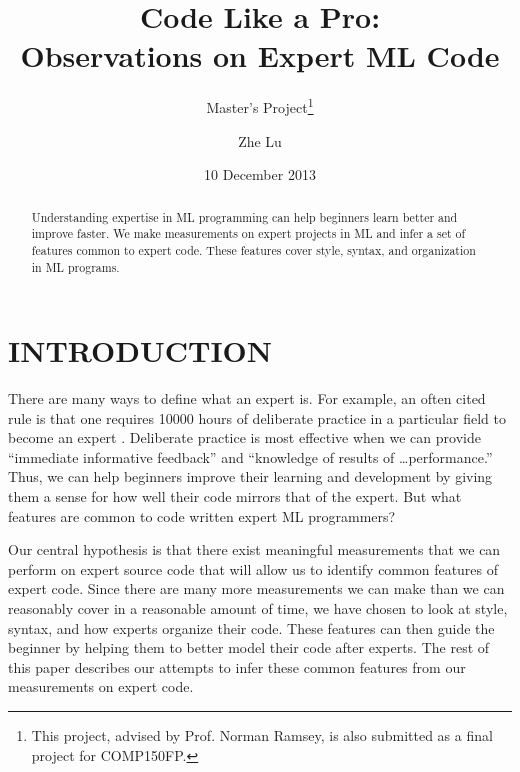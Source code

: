 \documentclass[12pt,abstracton]{scrartcl}
\title{Code Like a Pro:\\Observations on Expert ML Code}
\subtitle{Master's Project\footnote{This project, advised by Prof. Norman Ramsey, is also submitted as a final project for COMP150FP.}}
\author{Zhe Lu}
\date{10 December 2013}
\begin{document}


\maketitle
\begin{abstract}
Understanding expertise in ML programming can help beginners learn better and improve faster.
We make measurements on expert projects in ML and infer
a set of features common to expert code. These features cover
style, syntax, and organization in ML programs.
\end{abstract}
\section{INTRODUCTION}
There are many ways to define what an expert is.
For example, an often cited rule is that one requires 10000 hours of deliberate practice
in a particular field to become an expert \cite{Gla08}. 
Deliberate practice is most effective when we can provide ``immediate informative feedback''
and ``knowledge of results of \ldots performance.'' \cite{Eri93} Thus, we can help beginners 
improve their learning and development
by giving them a sense for how well their code mirrors that of the expert.
But what features are common to code written expert ML programmers?

Our central hypothesis is that there exist meaningful measurements
that we can perform on expert source code that will allow us
to identify common features of expert code. Since there are many more
measurements we can make than we can reasonably cover in a reasonable
amount of time, we have chosen to look at style,
syntax, and how experts organize their code.
These features can then guide the beginner by helping them
to better model their code after experts.
The rest of this paper describes our attempts to infer these
common features from our measurements on expert code.
\end{document}
